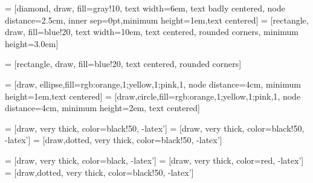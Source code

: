 
\usepackage[latin1]{inputenc}
\usepackage{tikz}

\usetikzlibrary{shapes,arrows}
\usetikzlibrary{arrows,positioning,mindmap} 
\usetikzlibrary{calc,trees,positioning,arrows,chains,shapes.geometric,%
decorations.pathreplacing,decorations.pathmorphing,shapes,%
matrix,shapes.symbols,plotmarks,decorations.markings,shadows}
\usetikzlibrary{patterns}

 = [diamond, draw, fill=gray!10,
  text width=6em, text badly centered, node distance=2.5cm, 
  inner sep=0pt,minimum height=1em,text centered]
 = [rectangle, draw, fill=blue!20,
  text width=10em, text centered, rounded corners, minimum height=3.0em]

 = [rectangle, draw, fill=blue!20, text centered, rounded corners]

 = [draw, ellipse,fill={rgb:orange,1;yellow,1;pink,1}, node distance=4cm,
    minimum height=1em,text centered]
 = [draw,circle,fill={rgb:orange,1;yellow,1;pink,1}, 
  node distance=4cm, minimum height=2em, text centered]

 = [draw, very thick, color=black!50, -latex']
 = [draw, very thick, color=black!50, -latex']
 = [draw,dotted, very thick, color=black!50, -latex']


 = [draw, very thick, color=black, -latex']
 = [draw, very thick, color=red, -latex']
 = [draw,dotted, very thick, color=black!50, -latex']






